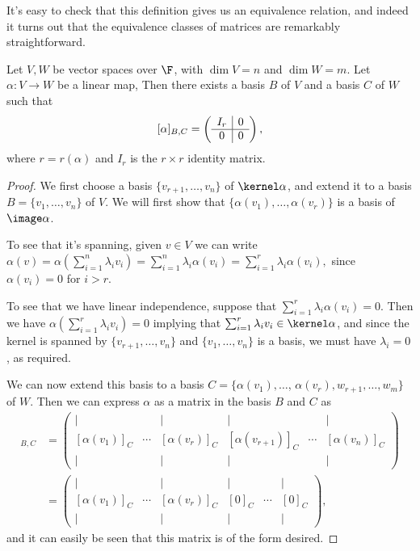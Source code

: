 \documentclass[a4paper]{scrartcl}
\begin{document}
It's easy to check that this definition gives us an equivalence relation, and indeed it turns out that the equivalence classes of matrices are remarkably straightforward.

\begin{proposition}
    Let $V, W$ be vector spaces over $\F$, with $\dim V = n$ and $\dim W = m$. Let $\alpha: V \rightarrow W$ be a linear map, Then there exists a basis $B$ of $V$ and a basis $C$ of $W$ such that
    $$
    [\alpha]_{B, C} = \left(\begin{array}{ c | c }
        I_r & 0 \\
        \hline
        0 & 0
      \end{array}\right),
    $$
    where $r = r(\alpha)$ and $I_r$ is the $r \times r$ identity matrix.
\end{proposition}
\begin{proof}
    We first choose a basis $\{v_{r + 1}, \dots, v_n\}$ of $\kernel \alpha$, and extend it to a basis $B = \{v_1, \dots, v_n\}$ of $V$.
    We will first show that $\{\alpha(v_1), \dots, \alpha(v_r)\}$ is a basis of $\image \alpha$.

    To see that it's spanning, given $v \in V$ we can write
    $\alpha(v) = \alpha\left(\sum_{i = 1}^n \lambda_i v_i\right) = \sum_{i = 1}^n \lambda_i \alpha(v_i) = \sum_{i =1}^r \lambda_i \alpha(v_i),
    $
    since $\alpha(v_i) = 0$ for $i > r$.
    
    To see that we have linear independence, suppose that $\sum_{i = 1}^r \lambda_i \alpha(v_i) = 0$. Then we have
    $
\alpha\left(\sum_{i = 1}^r \lambda_i v_i\right) = 0$ implying that
$\sum_{i = 1}^r \lambda_i v_i \in \kernel \alpha$,
    and since the kernel is spanned by $\{v_{r + 1}, \dots, v_n\}$ and $\{v_1, \dots, v_n\}$ is a basis, we must have $\lambda_i = 0$, as required.

    We can now extend this basis to a basis $C = \{\alpha(v_1), \dots$, $\alpha(v_r), w_{r + 1}, \dots, w_m \}$ of $W$. Then we can express $\alpha$ as a matrix in the basis $B$ and $C$ as
    \begin{align*}
        [\alpha]_{B, C} &=
    \begin{pmatrix}
        | &  & | & | &  & |\\
        [\alpha(v_1)]_C & \cdots & [\alpha(v_r)]_C & [\alpha(v_{r + 1})]_C & \cdots & [\alpha(v_n)]_C \\
        | &  & | & | &  & |
    \end{pmatrix} \\
    &= \begin{pmatrix}
        | &  & | & | &  & |\\
        [\alpha(v_1)]_C & \cdots & [\alpha(v_r)]_C & [0]_C & \cdots & [0]_C \\
        | &  & | & | &  & |
    \end{pmatrix},
    \end{align*}
    and it can easily be seen that this matrix is of the form desired.
\end{proof}
\end{document}
